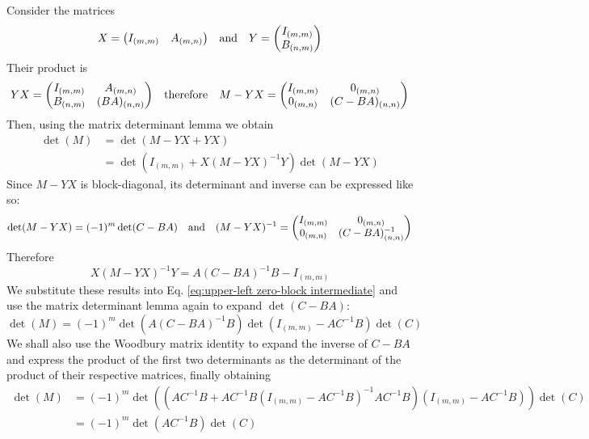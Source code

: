 \documentclass[12pt]{article}
\begin{document}
	Consider the matrices
	\begin{equation}
	X = \mqty(I_{(m,m)} & A_{(m, n)})\qq{and}Y = \mqty(I_{(m,m)} \\ B_{(n, m)})
	\end{equation}
	Their product is
	\begin{equation}
	YX = \mqty(I_{(m,m)} & A_{(m, n)} \\ B_{(n, m)} & (BA)_{(n, n)})\qq{therefore}M-YX=\mqty(I_{(m,m)} & 0_{(m, n)} \\ 0_{(m, n)} & (C - BA)_{(n, n)})
	\end{equation}
	Then, using the matrix determinant lemma we obtain
	\begin{align}\label{eq:upper-left zero-block intermediate}
	\det(M)&=\det(M-YX+YX)\nonumber\\
	&= \det(I_{(m, m)}+X(M-YX)^{-1}Y)\det(M-YX)
	\end{align}
	Since $M-YX$ is block-diagonal, its determinant and inverse can be expressed like so:
	\begin{equation}
	\det(M-YX)=(-1)^m\det(C-BA)\qq{and} (M-YX)^{-1}=\mqty(I_{(m,m)} & 0_{(m, n)} \\ 0_{(m, n)} & (C - BA)^{-1}_{(n, n)})
	\end{equation}
	Therefore
	\begin{equation}
	X(M-YX)^{-1}Y=A(C-BA)^{-1}B-I_{(m,m)}
	\end{equation}
	We substitute these results into Eq. \ref{eq:upper-left zero-block intermediate} and use the matrix determinant lemma again to expand $\det(C-BA)$:
	\begin{equation}
	\det(M)=(-1)^m \det(A(C-BA)^{-1}B)\det(I_{(m,m)}-AC^{-1}B)\det(C)
	\end{equation}
	We shall also use the Woodbury matrix identity to expand the inverse of $C-BA$ and express the product of the first two determinants as the determinant of the product of their respective matrices, finally obtaining
	\begin{align}
	\det(M)&=(-1)^m \det((AC^{-1}B+AC^{-1}B(I_{(m,m)}-AC^{-1}B)^{-1}AC^{-1}B)(I_{(m,m)}-AC^{-1}B))\det(C)\nonumber\\
	&= (-1)^m \det(AC^{-1}B)\det(C)
	\end{align}
	
\end{document}
